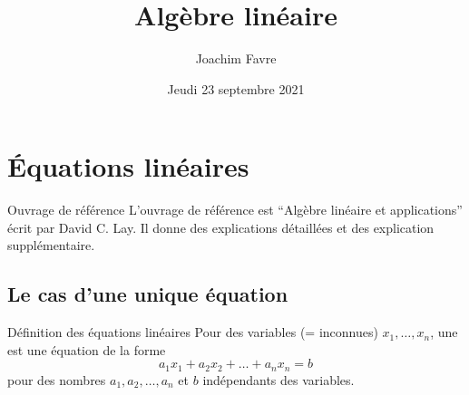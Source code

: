 \documentclass{article}
\title{Algèbre linéaire}
\author{Joachim Favre}
\date{Jeudi 23 septembre 2021}
\begin{document}
\maketitle


\section{Équations linéaires}

\begin{parag}{Ouvrage de référence}
    L'ouvrage de référence est ``Algèbre linéaire et applications'' écrit par David C. Lay. Il donne des explications détaillées et des explication supplémentaire.
\end{parag}

\subsection{Le cas d'une unique équation}
\begin{parag}{Définition des équations linéaires}
    Pour des variables (= inconnues) $x_1, \ldots, x_n$, une  est une équation de la forme
    \[a_1 x_1 + a_2 x_2 + \ldots + a_n x_n = b\]
    pour des nombres $a_1, a_2, \ldots, a_n$ et $b$ indépendants des variables.
\end{parag}
\end{document}
